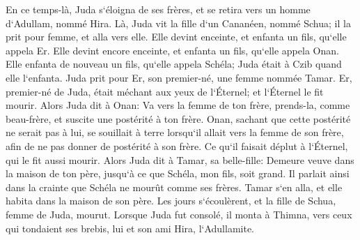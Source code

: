 \verse En ce temps-là, Juda s`éloigna de ses frères, et se retira vers un homme d`Adullam, nommé Hira. 
\verse Là, Juda vit la fille d`un Cananéen, nommé Schua; il la prit pour femme, et alla vers elle. 
\verse Elle devint enceinte, et enfanta un fils, qu`elle appela Er. 
\verse Elle devint encore enceinte, et enfanta un fils, qu`elle appela Onan. 
\verse Elle enfanta de nouveau un fils, qu`elle appela Schéla; Juda était à Czib quand elle l`enfanta. 
\verse Juda prit pour Er, son premier-né, une femme nommée Tamar. 
\verse Er, premier-né de Juda, était méchant aux yeux de l`Éternel; et l`Éternel le fit mourir. 
\verse Alors Juda dit à Onan: Va vers la femme de ton frère, prends-la, comme beau-frère, et suscite une postérité à ton frère. 
\verse Onan, sachant que cette postérité ne serait pas à lui, se souillait à terre lorsqu`il allait vers la femme de son frère, afin de ne pas donner de postérité à son frère. 
\verse Ce qu`il faisait déplut à l`Éternel, qui le fit aussi mourir. 
\verse Alors Juda dit à Tamar, sa belle-fille: Demeure veuve dans la maison de ton père, jusqu`à ce que Schéla, mon fils, soit grand. Il parlait ainsi dans la crainte que Schéla ne mourût comme ses frères. Tamar s`en alla, et elle habita dans la maison de son père. 
\verse Les jours s`écoulèrent, et la fille de Schua, femme de Juda, mourut. Lorsque Juda fut consolé, il monta à Thimna, vers ceux qui tondaient ses brebis, lui et son ami Hira, l`Adullamite. 
